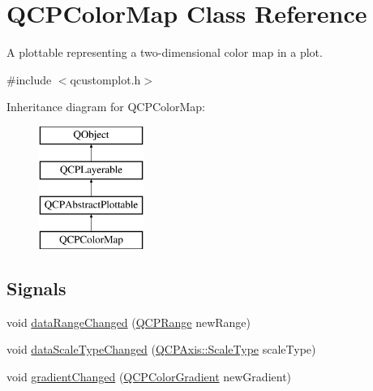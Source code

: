 \hypertarget{class_q_c_p_color_map}{}\section{Q\+C\+P\+Color\+Map Class Reference}
\label{class_q_c_p_color_map}


A plottable representing a two-\/dimensional color map in a plot.  




{\ttfamily \#include $<$qcustomplot.\+h$>$}

Inheritance diagram for Q\+C\+P\+Color\+Map\+:\begin{figure}[H]
\begin{center}
\leavevmode
\includegraphics[height=4.000000cm]{class_q_c_p_color_map}
\end{center}
\end{figure}
\subsection*{Signals}
\begin{DoxyCompactItemize}
\item 
void \hyperlink{class_q_c_p_color_map_a482980f2335d09cfb36dd95ba9663197}{data\+Range\+Changed} (\hyperlink{class_q_c_p_range}{Q\+C\+P\+Range} new\+Range)
\item 
void \hyperlink{class_q_c_p_color_map_a978d5d5c9f68cffef8c902b855c04490}{data\+Scale\+Type\+Changed} (\hyperlink{class_q_c_p_axis_a36d8e8658dbaa179bf2aeb973db2d6f0}{Q\+C\+P\+Axis\+::\+Scale\+Type} scale\+Type)
\item 
void \hyperlink{class_q_c_p_color_map_abf4797f86e422ac6e0f732c4ff1a4d49}{gradient\+Changed} (\hyperlink{class_q_c_p_color_gradient}{Q\+C\+P\+Color\+Gradient} new\+Gradient)
\end{DoxyCompactItemize}
